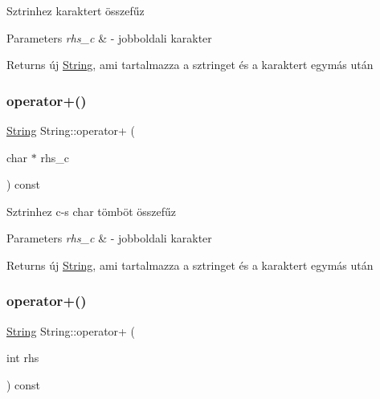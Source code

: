 Sztrinhez karaktert összefűz 
\begin{DoxyParams}{Parameters}
{\em rhs\+\_\+c} & -\/ jobboldali karakter \\
\hline
\end{DoxyParams}
\begin{DoxyReturn}{Returns}
új \mbox{\hyperlink{class_string}{String}}, ami tartalmazza a sztringet és a karaktert egymás után 
\end{DoxyReturn}
\mbox{\label{class_string_aaf1767dc1e01db12d0e183fa41eba2b7}} 
\subsubsection{\texorpdfstring{operator+()}{operator+()}\hspace{0.1cm}{\footnotesize\ttfamily [3/4]}}
{\footnotesize\ttfamily \mbox{\hyperlink{class_string}{String}} String\+::operator+ (\begin{DoxyParamCaption}\item[{char $\ast$}]{rhs\+\_\+c }\end{DoxyParamCaption}) const\hspace{0.3cm}{\ttfamily [inline]}}

Sztrinhez c-\/s char tömböt összefűz 
\begin{DoxyParams}{Parameters}
{\em rhs\+\_\+c} & -\/ jobboldali karakter \\
\hline
\end{DoxyParams}
\begin{DoxyReturn}{Returns}
új \mbox{\hyperlink{class_string}{String}}, ami tartalmazza a sztringet és a karaktert egymás után 
\end{DoxyReturn}
\mbox{\label{class_string_a230ad695c7bc7be7c690d215d20e4210}} 
\subsubsection{\texorpdfstring{operator+()}{operator+()}\hspace{0.1cm}{\footnotesize\ttfamily [4/4]}}
{\footnotesize\ttfamily \mbox{\hyperlink{class_string}{String}} String\+::operator+ (\begin{DoxyParamCaption}\item[{int}]{rhs }\end{DoxyParamCaption}) const}

